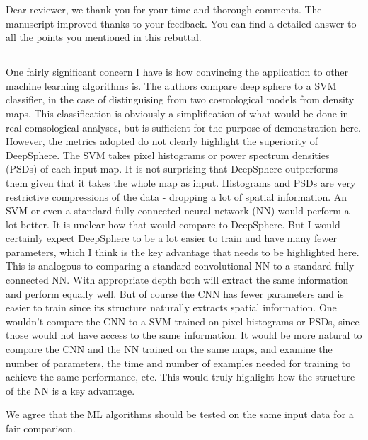\documentclass[12pt,a4paper]{article}
\newcommand{\1}{\b{1}}              %
\newcommand{\0}{\b{0}}              %
\begin{document}
Dear reviewer, we thank you for your time and thorough comments. The manuscript improved thanks to your feedback. You can find a detailed answer to all the points you mentioned in this rebuttal.

\subsection{}
\begin{mdframed}[style=comment]
One fairly significant concern I have is how convincing the application to other machine learning algorithms is. The authors compare deep sphere to a SVM classifier, in the case of distinguising from two cosmological models from density maps. This classification is obviously a simplification of what would be done in real comsological analyses, but is sufficient for the purpose of demonstration here. However, the metrics adopted do not clearly highlight the superiority of DeepSphere. The SVM takes pixel histograms or power spectrum densities (PSDs) of each input map. It is not surprising that DeepSphere outperforms them given that it takes the whole map as input. Histograms and PSDs are very restrictive compressions of the data - dropping a lot of spatial information. An SVM or even a standard fully connected neural network (NN) would perform a lot better. It is unclear how that would compare to DeepSphere. But I would certainly expect DeepSphere to be a lot easier to train and have many fewer parameters, which I think is the key advantage that needs to be highlighted here. This is analogous to comparing a standard convolutional NN to a standard fully-connected NN. With appropriate depth both will extract the same information and perform equally well. But of course the CNN has fewer parameters and is easier to train since its structure naturally extracts spatial information. One wouldn't compare the CNN to a SVM trained on pixel histograms or PSDs, since those would not have access to the same information. It would be more natural to compare the CNN and the NN trained on the same maps, and examine the number of parameters, the time and number of examples needed for training to achieve the same performance, etc. This would truly highlight how the structure of the NN is a key advantage.
\end{mdframed}

We agree that the ML algorithms should be tested on the same input data for a fair comparison.
\end{document}
